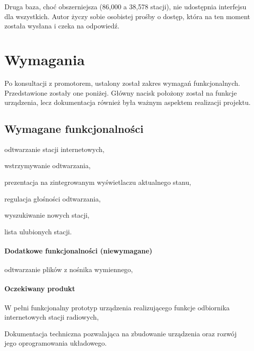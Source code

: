 \documentclass[polish]{aghengthesis}
\let\tempone\itemize
\let\temptwo\enditemize
\renewenvironment{itemize}{\tempone\setlength{\itemsep}{0cm}}{\temptwo}
\begin{document}
		Druga baza, choć obszerniejsza (86,000 a 38,578 stacji), nie udostępnia interfejsu dla wszystkich. Autor życzy sobie osobistej prośby o dostęp, która na ten moment została wysłana i czeka na odpowiedź.
		
	\section{Wymagania}
		Po konsultacji z promotorem, ustalony został zakres wymagań funkcjonalnych. Przedstawione zostały one poniżej. Główny nacisk położony został na funkcje urządzenia, lecz dokumentacja również była ważnym aspektem realizacji projektu.
	
		
		\subsection{Wymagane funkcjonalności}
			\begin{itemize}
				\item odtwarzanie stacji internetowych,
				\item wstrzymywanie odtwarzania,
				\item prezentacja na zintegrowanym wyświetlaczu aktualnego stanu,
				\item regulacja głośności odtwarzania,
				\item wyszukiwanie nowych stacji,
				\item lista ulubionych stacji.
			\end{itemize}
			
			\paragraph{Dodatkowe funkcjonalności (niewymagane)}
			\begin{itemize}
				\item odtwarzanie plików z nośnika wymiennego,
			\end{itemize}
		
			\paragraph{Oczekiwany produkt}
			\begin{itemize}
				\item W pełni funkcjonalny prototyp urządzenia realizującego funkcje odbiornika internetowych stacji radiowych,
				\item Dokumentacja techniczna pozwalająca na zbudowanie urządzenia oraz rozwój jego oprogramowania układowego.
			\end{itemize}
		
\end{document}
